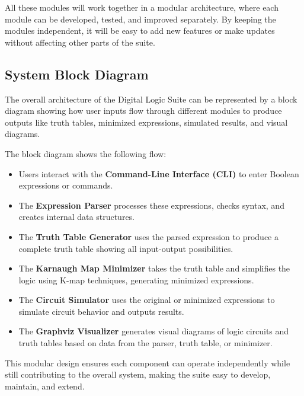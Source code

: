 All these modules will work together in a modular architecture, where each module can be developed, tested, and improved separately. By keeping the modules independent, it will be easy to add new features or make updates without affecting other parts of the suite.

\clearpage

\subsection{System Block Diagram}


The overall architecture of the Digital Logic Suite can be represented by a block diagram showing how user inputs flow through different modules to produce outputs like truth tables, minimized expressions, simulated results, and visual diagrams.


\noindent The block diagram shows the following flow:
\begin{itemize}
    \item Users interact with the \textbf{Command-Line Interface (CLI)} to enter Boolean expressions or commands.
    \item The \textbf{Expression Parser} processes these expressions, checks syntax, and creates internal data structures.
    \item The \textbf{Truth Table Generator} uses the parsed expression to produce a complete truth table showing all input-output possibilities.
    \item The \textbf{Karnaugh Map Minimizer} takes the truth table and simplifies the logic using K-map techniques, generating minimized expressions.
    \item The \textbf{Circuit Simulator} uses the original or minimized expressions to simulate circuit behavior and outputs results.
    \item The \textbf{Graphviz Visualizer} generates visual diagrams of logic circuits and truth tables based on data from the parser, truth table, or minimizer.
\end{itemize}

This modular design ensures each component can operate independently while still contributing to the overall system, making the suite easy to develop, maintain, and extend.

